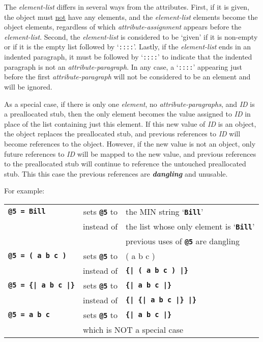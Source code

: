 \documentclass[12pt]{article}
\newcommand{\TT}[1]{{\tt \bfseries #1}}
\newcommand{\key}[1]{{\bf \em #1}\index{#1}}
\newenvironment{indpar}[1][0.3in]%
	{\begin{list}{}%
		     {\setlength{\itemsep}{0in}%
		      \setlength{\topsep}{0in}%
		      \setlength{\parsep}{1ex}%
		      \setlength{\labelwidth}{#1}%
		      \setlength{\leftmargin}{#1}%
		      \addtolength{\leftmargin}{\labelsep}}%
	 \item}%
	{\end{list}}
\begin{document}
\begin{indpar}
\begin{indpar}[0.5em]
The {\em element-list} differs in several ways from the
attributes.  First, if it is given, the object must \underline{not} have
any elements, and the {\em element-list} elements become the
object elements, regardless of which {\em attribute-assignment}
appears before the {\em element-list}.
Second, the {\em element-list} is considered
to be `given' if it is non-empty or if it is the empty list
followed by `{\tt ::::}'.  Lastly, if the {\em element-list}
ends in an indented paragraph, it must be followed by `{\tt ::::}'
to indicate that the indented paragraph is not an {\em attribute-paragraph}.
In any case, a `{\tt ::::}' appearing just before the first
{\em attribute-paragraph} will not be considered to be an element
and will be ignored.

As a special case, if there is only one {\em element}, no
{\em attribute-paragraphs},
and {\em ID} is a preallocated stub,
then the only element becomes the value assigned to {\em ID}
in place of the list containing just this element.
If this new value of {\em ID} is an object, the object replaces
the preallocated stub, and previous references to {\em ID} will become
references to the object.  However, if the new value is not an object,
only future references to {\em ID} will be mapped to the new value,
and previous references to the preallocated stub will continue to
reference the untouched preallocated stub.  This this case the
previous references are \key{dangling} and unusable.

For example:
\begin{center}
\begin{tabular}{lrl}
\TT{@5 = Bill}      & sets \TT{@5} to  & the MIN string `\TT{Bill}' \\
                    & instead of       & the list whose only element is
		    					`\TT{Bill}' \\
		    &  & previous uses of \TT{@5} are dangling
\\[1ex]
\TT{@5 = ( a b c )} & sets \TT{@5} to & ( a b c ) \\
                    & instead of      & \TT{\{| ( a b c ) |\}}
\\[1ex]
\TT{@5 = \{| a b c |\}} & sets \TT{@5} to & \TT{\{| a b c |\}} \\
                    & instead of      & \TT{\{| \{| a b c |\} |\}}
\\[1ex]
\TT{@5 = a b c}     & sets \TT{@5} to  & \TT{\{| a b c |\}} \\
		    & \multicolumn{2}{l}{which is NOT a special case}
\end{tabular}
\end{center}


\end{indpar}
\end{indpar}
\end{document}
